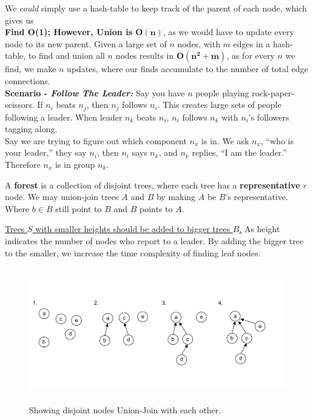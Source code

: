\noindent
We \textit{could} simply use a hash-table to keep track of the parent of each node, which gives us\\ 
\textbf{Find O(1); However, Union is $\mathbf{O(n)}$}, as we would have to update every node to its new parent. Given a large set of $n$ nodes, with $m$ edges in a hash-table, to find and union all $n$ nodes
results in \textbf{$\mathbf{O(n^2+m)}$}, as for every $n$ we find, we make $n$ updates, where our finds accumulate to the number of total edge connections.\\

\noindent
\textbf{Scenario - \textit{Follow The Leader:}}
Say you have $n$ people playing rock-paper-scissors. If $n_i$ beats $n_j$, then $n_j$ follows $n_i$. This 
creates large sets of people following a leader. When leader $n_k$ beats $n_i$, $n_i$ follows $n_k$ with $n_i$'s followers tagging along.\\

\noindent
Say we are trying to figure out which component $n_x$ is in. We ask $n_x$, ``who is your leader,'' they say $n_i$, then $n_i$ says $n_k$, and $n_k$ replies, ``I am the leader.'' 
Therefore $n_x$ is in group $n_k$.
\begin{Def}[Forest]

    A \textbf{forest} is a collection of disjoint trees, where each tree has a \textbf{representative} $r$ node. We may
    union-join trees $A$ and $B$ by making $A$ be $B$'s representative. Where $b\in B$ still point to $B$ and $B$ points to $A$.

    \underline{Trees $S$ with smaller heights should be added to bigger trees $B$.} As height indicates the number of nodes who report to a leader.
    By adding the bigger tree to the smaller, we increase the time complexity of finding leaf nodes.

\end{Def}

\vspace{-3.5em}
\begin{figure}[h]
    \centering
    \includegraphics[height=2.3in]{./Sections/spanning/forest-diag.png}
    
    \vspace{-2em}
    \caption{Showing disjoint nodes Union-Join with each other.}
    \label{fig:forest_diag}
\end{figure}

